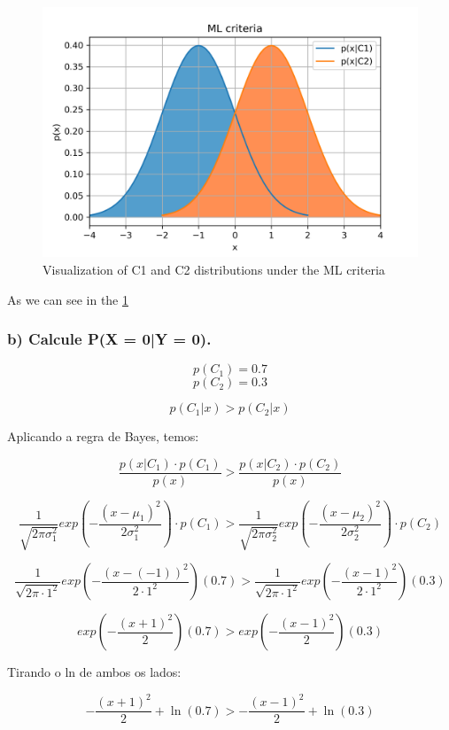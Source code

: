 \documentclass[a4paper]{article}
\begin{document}
\begin{figure}[h]
    \centering
    \includegraphics[width=12cm]{ML}
    \caption{Visualization of C1 and C2 distributions under the ML criteria}
    \label{fig:ML}
\end{figure}

As we can see in the \ref{fig:ML}

\subsubsection{b) Calcule P(X = 0|Y = 0).}

$$ p(C_1) = 0.7 $$
$$ p(C_2) = 0.3 $$


$$ p(C_1|x) > p(C_2|x) $$

Aplicando a regra de Bayes, temos:

$$ \frac{p(x|C_1)\cdot p(C_1)}{p(x)} > \frac{p(x|C_2)\cdot p(C_2)}{p(x)} $$

$$ \frac{1}{\sqrt{2\pi\sigma_1^2}}exp\left(-\frac{(x-\mu_1)^2}{2 \sigma_1^2}\right)\cdot p(C_1) > \frac{1}{\sqrt{2\pi\sigma_2^2}}exp\left(-\frac{(x-\mu_2)^2}{2 \sigma_2^2}\right) \cdot p(C_2) $$

$$ \frac{1}{\sqrt{2\pi\cdot1^2}}exp\left(-\frac{(x-(-1))^2}{2\cdot1^2}\right) (0.7) > \frac{1}{\sqrt{2\pi\cdot1^2}}exp\left(-\frac{(x-1)^2}{2\cdot1^2}\right) (0.3) $$

$$ exp\left(-\frac{(x+1)^2}{2}\right) (0.7) > exp\left(-\frac{(x-1)^2}{2}\right) (0.3) $$

Tirando o ln de ambos os lados:

$$ -\frac{(x+1)^2}{2} + \ln(0.7) > -\frac{(x-1)^2}{2} + \ln(0.3) $$
\end{document}
